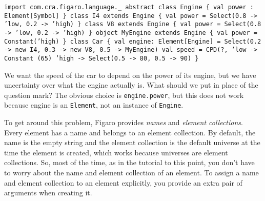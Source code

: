 \begin{flushleft}
\texttt{import com.cra.figaro.language.\_
\newline 
\newline abstract class Engine \{ val power : Element[Symbol] \}
\newline class I4 extends Engine \{
\newline \tab val power = Select(0.8 -> 'low, 0.2 -> 'high) 
\newline \}
\newline class V8 extends Engine \{
\newline \tab val power = Select(0.8 -> 'low, 0.2 -> 'high)
\newline \}
\newline 
\newline object MyEngine extends Engine \{
\newline \tab val power = Constant('high)
\newline \}
\newline class Car \{
\newline \tab val engine: Element[Engine] =
\newline \tab Select(0.2 -> new I4, 0.3 -> new V8, 0.5 -> MyEngine)
\newline \tab val speed = CPD(?,
\newline \tab 'low -> Constant (65)
\newline \tab 'high -> Select(0.5 -> 80, 0.5 -> 90)
\newline \}
}
\end{flushleft}

We want the speed of the car to depend on the power of its engine, but we have uncertainty over what the engine actually is. What should we put in place of the question mark? The obvious choice is \texttt{engine.power}, but this does not work because engine is an \texttt{Element\-[Engine]}, not an instance of \texttt{Engine}.

To get around this problem, Figaro provides \emph{names} and \emph{element collections}. Every element has a name and belongs to an element collection. By default, the name is the empty string and the element collection is the default universe at the time the element is created, which works because universes are element collections. So, most of the time, as in the tutorial to this point, you don't have to worry about the name and element collection of an element. To assign a name and element collection to an element explicitly, you provide an extra pair of arguments when creating it.

